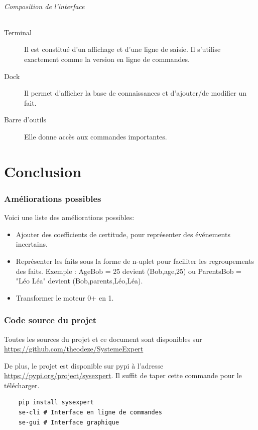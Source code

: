 \documentclass[a4paper, 11pt]{article}
\begin{document}
\paragraph{Composition de l'interface}

\begin{description}
    \item[Terminal] Il est constitué d'un affichage et d'une ligne de saisie. Il s'utilise exactement comme la version en ligne de commandes.
    \item[Dock] Il permet d'afficher la base de connaissances et d'ajouter/de modifier un fait.
    \item[Barre d'outils] Elle donne accès aux commandes importantes.
\end{description}

\part{Conclusion}

\section{Améliorations possibles}

Voici une liste des améliorations possibles:

\begin{itemize}
    \item Ajouter des coefficients de certitude, pour représenter des événements incertains.
    \item Représenter les faits sous la forme de n-uplet pour faciliter les regroupements des faits. Exemple : AgeBob = 25 devient (Bob,age,25) ou ParentsBob = "Léo Léa" devient (Bob,parents,Léo,Léa).
    \item Transformer le moteur 0+ en 1.
\end{itemize}

\section{Code source du projet}

Toutes les sources du projet et ce document sont disponibles sur \url{https://github.com/theodeze/SystemeExpert}

De plus, le projet est disponible sur pypi à l'adresse \url{https://pypi.org/project/sysexpert}. Il suffit de taper cette commande pour le télécharger.

\begin{verbatim}
    pip install sysexpert
    se-cli # Interface en ligne de commandes
    se-gui # Interface graphique
\end{verbatim}
\end{document}
